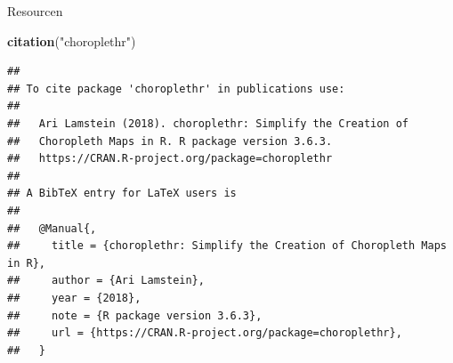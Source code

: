 \documentclass[ignorenonframetext,]{beamer}
\newenvironment{Shaded}{\begin{snugshade}}{\end{snugshade}}
\newcommand{\KeywordTok}[1]{\textcolor[rgb]{0.13,0.29,0.53}{\textbf{#1}}}
\newcommand{\NormalTok}[1]{#1}
\newcommand{\StringTok}[1]{\textcolor[rgb]{0.31,0.60,0.02}{#1}}
\begin{document}
\begin{frame}[fragile]{Resourcen}
\protect\hypertarget{resourcen}{}

\begin{Shaded}
\begin{Highlighting}[]
\KeywordTok{citation}\NormalTok{(}\StringTok{"choroplethr"}\NormalTok{)}
\end{Highlighting}
\end{Shaded}

\begin{verbatim}
## 
## To cite package 'choroplethr' in publications use:
## 
##   Ari Lamstein (2018). choroplethr: Simplify the Creation of
##   Choropleth Maps in R. R package version 3.6.3.
##   https://CRAN.R-project.org/package=choroplethr
## 
## A BibTeX entry for LaTeX users is
## 
##   @Manual{,
##     title = {choroplethr: Simplify the Creation of Choropleth Maps in R},
##     author = {Ari Lamstein},
##     year = {2018},
##     note = {R package version 3.6.3},
##     url = {https://CRAN.R-project.org/package=choroplethr},
##   }
\end{verbatim}

\end{frame}
\end{document}
